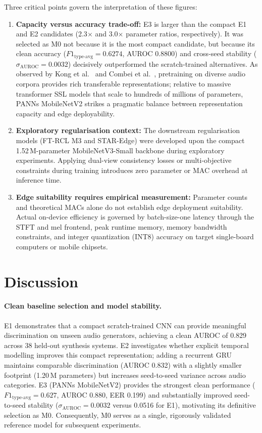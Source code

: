 Three critical points govern the interpretation of these figures:
\begin{enumerate}[label=\textbf{\arabic*.},leftmargin=*,itemsep=0.2em]
  \item \textbf{Capacity versus accuracy trade-off:} E3 is larger than the compact E1 and E2 candidates (2.3$\times$ and 3.0$\times$ parameter ratios, respectively). It was selected as M0 not because it is the most compact candidate, but because its clean accuracy ($F1_{\mathrm{type\text{-}avg}}=0.6274$, AUROC 0.8800) and cross-seed stability ($\sigma_{\mathrm{AUROC}}=0.0032$) decisively outperformed the scratch-trained alternatives. As observed by Kong et al.~\cite{kong2020panns} and Combei et al.~\cite{combei2024wavlm}, pretraining on diverse audio corpora provides rich transferable representations; relative to massive transformer SSL models that scale to hundreds of millions of parameters, PANNs MobileNetV2 strikes a pragmatic balance between representation capacity and edge deployability.
  \item \textbf{Exploratory regularisation context:} The downstream regularisation models (FT-RCL M3 and STAR-Edge) were developed upon the compact 1.52\,M-parameter MobileNetV3-Small backbone during exploratory experiments. Applying dual-view consistency losses or multi-objective constraints during training introduces zero parameter or MAC overhead at inference time.
  \item \textbf{Edge suitability requires empirical measurement:} Parameter counts and theoretical MACs alone do not establish edge deployment suitability. Actual on-device efficiency is governed by batch-size-one latency through the STFT and mel frontend, peak runtime memory, memory bandwidth constraints, and integer quantization (INT8) accuracy on target single-board computers or mobile chipsets.
\end{enumerate}

\section{Discussion}
\label{sec:discussion}

\paragraph{Clean baseline selection and model stability.} E1 demonstrates that a compact scratch-trained CNN can provide meaningful discrimination on unseen audio generators, achieving a clean AUROC of 0.829 across 38 held-out synthesis systems. E2 investigates whether explicit temporal modelling improves this compact representation; adding a recurrent GRU maintains comparable discrimination (AUROC 0.832) with a slightly smaller footprint (1.20\,M parameters) but increases seed-to-seed variance across audio categories. E3 (PANNs MobileNetV2) provides the strongest clean performance ($F1_{\mathrm{type\text{-}avg}} = 0.627$, AUROC 0.880, EER 0.199) and substantially improved seed-to-seed stability ($\sigma_{\mathrm{AUROC}} = 0.0032$ versus 0.0516 for E1), motivating its definitive selection as M0. Consequently, M0 serves as a single, rigorously validated reference model for subsequent experiments.

